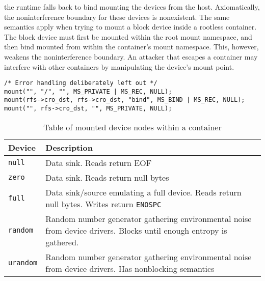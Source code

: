 the runtime falls back to bind mounting the devices from the host. 
Axiomatically, the noninterference boundary for these devices is nonexistent. 
The same semantics apply when trying to mount a block device inside a 
rootless container. The block device must first be mounted within the root mount namespace, and 
then bind mounted from within the container's mount namespace. This, however, weakens the 
noninterference boundary. An attacker that escapes a container may interfere with other containers
by manipulating the device's mount point.
\begin{lstlisting}[style=c-code-snippets, label={code:implementation/namespaces/mount}, caption={Remounting the original root filesystem to disable mount propagation events and bind mounting the container's root filesystem onto itself.}]
/* Error handling deliberately left out */
mount("", "/", "", MS_PRIVATE | MS_REC, NULL);
mount(rfs->cro_dst, rfs->cro_dst, "bind", MS_BIND | MS_REC, NULL);
mount("", rfs->cro_dst, "", MS_PRIVATE, NULL);
\end{lstlisting}

\begin{table}[h!]
    \centering
    \begin{tabular}{ |m{4cm}|m{20em}| }
        \hline
        Device & Description \\
        \hline
        \verb|null| & Data sink. Reads return EOF \\
        \hline 
        \verb|zero| & Data sink. Reads return null bytes \\
        \hline
        \verb|full| & Data sink/source emulating a full device. Reads return null bytes. Writes return \verb|ENOSPC| \\
        \hline
        \verb|random| & Random number generator gathering environmental noise from device drivers. Blocks until enough entropy is gathered. \\
        \hline
        \verb|urandom| & Random number generator gathering environmental noise from device drivers. Has nonblocking semantics \\
        \hline
    \end{tabular}
    \caption{Table of mounted device nodes within a container}
    \label{table:implementation/runtime/devices}
\end{table}

